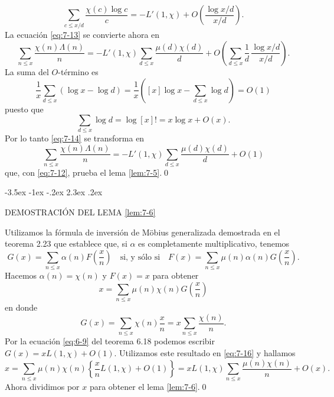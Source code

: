 \documentclass[12pt,a4paper]{book}
\makeatletter
\renewcommand\section{\@startsection{section}{1}{\z@}%
  {-3.5ex \@plus -1ex \@minus -.2ex}%
  {2.3ex \@plus .2ex}%
  {\normalfont\Large\bfseries\raggedright}}
\makeatother
\begin{document}
    \begin{equation*}
        \sum_{c\leq x/d}\frac{\chi(c)\log c}{c}=-L'(1,\chi)+O\left(\frac{\log x/d}{x/d}\right).
    \end{equation*}
    La ecuación \eqref{eq:7-13} se convierte ahora en
    \begin{equation}\label{eq:7-14}
        \sum_{n\leq x}\frac{\chi(n)\Lambda(n)}{n}=-L'(1,\chi)\sum_{d\leq x}
        \frac{\mu(d)\chi(d)}{d}+O\left(\sum_{d\leq x}\frac{1}{d}\,\frac{\log x/d}{x/d}\right).
    \end{equation}
    La suma del $O$-término es
    \begin{equation*}
        \frac{1}{x}\sum_{d\leq x}(\log x-\log d)=\frac{1}{x}\left([x]\log x-\sum_{d\leq x}\log d\right)=O(1)
    \end{equation*}
    puesto que
    \begin{equation*}
        \sum_{d\leq x}\log d=\log[x]!=x\log x+O(x).
    \end{equation*}
    Por lo tanto \eqref{eq:7-14} se transforma en
    \begin{equation*}
        \sum_{n\leq x}\frac{\chi(n)\Lambda(n)}{n}=-L'(1,\chi)\sum_{d\leq x}\frac{\mu(d)\chi(d)}{d}+O(1)
    \end{equation*}
    que, con \eqref{eq:7-12}, prueba el lema \ref{lem:7-5}.\qed

    \section{DEMOSTRACIÓN DEL LEMA \ref{lem:7-6}}

    Utilizamos la fórmula de inversión de Möbius generalizada demostrada en el teorema
    2.23 que establece que, si $\alpha$ es completamente multiplicativo, tenemos
    \begin{equation}\label{eq:7-15}
        G(x)=\sum_{n\leq x}\alpha(n)F\left(\frac{x}{n}\right)\quad\text{si, y sólo si}\quad
        F(x)=\sum_{n\leq x}\mu(n)\alpha(n)G\left(\frac{x}{n}\right).
    \end{equation}
    Hacemos $\alpha(n)=\chi(n)$ y $F(x)=x$ para obtener
    \begin{equation}\label{eq:7-16}
        x=\sum_{n\leq x}\mu(n)\chi(n)G\left(\frac{x}{n}\right)
    \end{equation}
    en donde
    \begin{equation*}
        G(x)=\sum_{n\leq x}\chi(n)\frac{x}{n}=x\sum_{n\leq x}\frac{\chi(n)}{n}.
    \end{equation*}
    Por la ecuación \eqref{eq:6-9} del teorema 6.18 podemos escribir
    $G(x)=xL(1,\chi)+O(1)$. Utilizamos este resultado en \eqref{eq:7-16} y hallamos
    \begin{equation*}
        x=\sum_{n\leq x}\mu(n)\chi(n)\left\{\frac{x}{n}L(1,\chi)+O(1)\right\}
        =xL(1,\chi)\sum_{n\leq x}\frac{\mu(n)\chi(n)}{n}+O(x).
    \end{equation*}
    Ahora dividimos por $x$ para obtener el lema \ref{lem:7-6}.\qed
\end{document}
